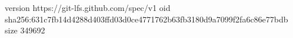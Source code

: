 version https://git-lfs.github.com/spec/v1
oid sha256:631c7fb14d4288d403ffd03d0ce4771762b63fb3180d9a7099f2fa6c86e77bdb
size 349692
